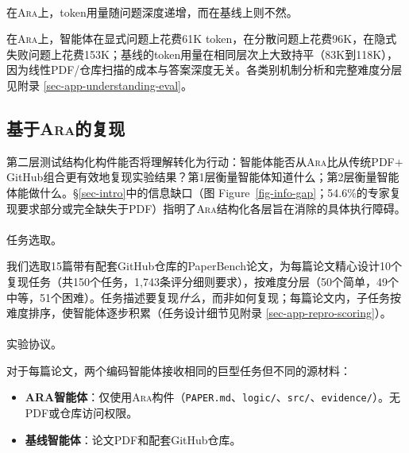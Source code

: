 \documentclass[
]{article}
\makeatletter
\let\oldparagraph\paragraph
\renewcommand{\paragraph}{
    \@ifstar
      \xxxParagraphStar
      \xxxParagraphNoStar
  }
\newcommand{\xxxParagraphStar}[1]{\oldparagraph*{#1}\mbox{}}
\newcommand{\xxxParagraphNoStar}[1]{\oldparagraph{#1}\mbox{}}
\newcommand{\passthrough}[1]{#1}
\providecommand{\tightlist}{%
  \setlength{\itemsep}{0pt}\setlength{\parskip}{0pt}}
\theoremstyle{definition}
\newcommand{\ara}{\textsc{Ara}}
\makeatother
\begin{document}
\paragraph{\texorpdfstring{在\ara{}上，token用量随问题深度递增，而在基线上则不然。}{在上，token用量随问题深度递增，而在基线上则不然。}}\label{ux5728b58fc729-690b-4000-b19f-365a4093b2ff7b7b3c207465726d20617261203e7d7dux4e0atokenux7528ux91cfux968fux95eeux9898ux6df1ux5ea6ux9012ux589eux800cux5728ux57faux7ebfux4e0aux5219ux4e0dux7136}

在\ara{}上，智能体在显式问题上花费61K
token，在分散问题上花费96K，在隐式失败问题上花费153K；基线的token用量在相同层次上大致持平（83K到118K），因为线性PDF/仓库扫描的成本与答案深度无关。各类别机制分析和完整难度分层见附录
\ref{sec-app-understanding-eval}。

\subsection{\texorpdfstring{基于\ara{}的复现}{基于的复现}}\label{sec-eval-reproduction}

第二层测试结构化构件能否将理解转化为行动：智能体能否从\ara{}比从传统PDF\(+\)GitHub组合更有效地复现实验结果？第1层衡量智能体知道什么；第2层衡量智能体能做什么。\S\ref{sec-intro}中的信息缺口（图
Figure~\ref{fig-info-gap}；54.6\%的专家复现要求部分或完全缺失于PDF）指明了\ara{}结构化各层旨在消除的具体执行障碍。

\paragraph{任务选取。}\label{ux4efbux52a1ux9009ux53d6}

我们选取15篇带有配套GitHub仓库的PaperBench论文，为每篇论文精心设计10个复现任务（共150个任务，1,743条评分细则要求），按难度分层（50个简单，49个中等，51个困难）。任务描述要复现\emph{什么}，而非如何复现；每篇论文内，子任务按难度排序，使智能体逐步积累（任务设计细节见附录
\ref{sec-app-repro-scoring}）。

\paragraph{实验协议。}\label{ux5b9eux9a8cux534fux8bae}

对于每篇论文，两个编码智能体接收相同的巨型任务但不同的源材料：

\begin{itemize}
\tightlist
\item
  \textbf{ARA智能体}：仅使用\ara{}构件（\passthrough{\lstinline!PAPER.md!}、\passthrough{\lstinline!logic/!}、\passthrough{\lstinline!src/!}、\passthrough{\lstinline!evidence/!}）。无PDF或仓库访问权限。
\item
  \textbf{基线智能体}：论文PDF和配套GitHub仓库。
\end{itemize}
\end{document}
